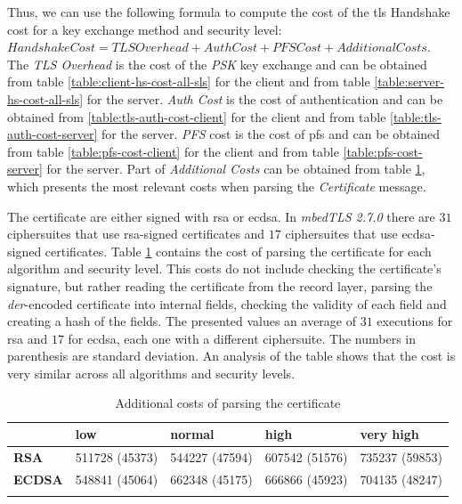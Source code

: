 \documentclass{llncs}
\begin{document}
Thus, we can use the following formula to compute the cost of the \gls{tls} Handshake cost for a key exchange method and
security level: $Handshake Cost = TLS Overhead + Auth Cost + PFS Cost + Additional Costs$. The \textit{TLS Overhead} is the cost of the
\textit{PSK} key exchange and can be obtained from table \ref{table:client-hs-cost-all-sls} for the client
and from table \ref{table:server-hs-cost-all-sls} for the server. \textit{Auth Cost} is the cost of authentication and can be obtained
from \ref{table:tls-auth-cost-client} for the client and from table \ref{table:tls-auth-cost-server} for the server. \textit{PFS} cost
is the cost of \gls{pfs} and can be obtained from table \ref{table:pfs-cost-client} for the client and from table \ref{table:pfs-cost-server}
for the server. Part of \textit{Additional Costs} can be obtained from table \ref{table:cert-parse-cost}, which presents the most relevant
costs when parsing the \textit{Certificate} message.

The certificate are either signed with
\gls{rsa} or \gls{ecdsa}. In \textit{mbedTLS 2.7.0} there are $31$ ciphersuites that use \gls{rsa}-signed certificates and $17$ ciphersuites
that use \gls{ecdsa}-signed certificates. Table \ref{table:cert-parse-cost} contains the cost of parsing the certificate for each algorithm
and security level. This costs do not include checking the certificate's signature, but rather reading the certificate from the record layer,
parsing the \textit{der}-encoded certificate into internal fields, checking the validity of each field and creating a hash of the fields.
The presented values an average of $31$ executions for \gls{rsa} and $17$ for \gls{ecdsa}, each one with a
different ciphersuite. The numbers in parenthesis are standard deviation. An analysis of the table shows that the cost is very similar across all
algorithms and security levels.

\begin{table}[]
\begin{tabular}{|l|l|l|l|l|}
\hline
               & \textbf{low}   & \textbf{normal} & \textbf{high} & \textbf{very high} \\ \hline
\textbf{RSA}   & 511728 (45373) & 544227 (47594)  & 607542 (51576) & 735237 (59853)      \\ \hline
\textbf{ECDSA} & 548841 (45064) & 662348 (45175) & 666866 (45923)  & 704135 (48247)        \\ \hline
\textbf{}
\end{tabular}
\centering \caption{ \label{table:cert-parse-cost} Additional costs of parsing the certificate}

\end{table}
\end{document}
